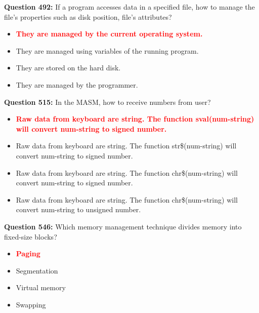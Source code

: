 \documentclass[12pt,a4paper]{article}
\begin{document}
\vspace{0.5cm}

\vspace{0.5cm}

\textbf{Question 492:} If a program accesses data in a specified file, how to manage the file's properties such as disk position, file's attributes?

\begin{itemize}
    \item[\textbf{A.}] \textcolor{red}{\textbf{They are managed by the current operating system.}}
    \item[\textbf{B.}] They are managed using variables of the running program.
    \item[\textbf{C.}] They are stored on the hard disk.
    \item[\textbf{D.}] They are managed by the programmer.
\end{itemize}

\vspace{0.5cm}

\vspace{0.5cm}

\textbf{Question 515:} In the MASM, how to receive numbers from user?

\begin{itemize}
    \item[\textbf{A.}] \textcolor{red}{\textbf{Raw data from keyboard are string. The function sval(num-string) will convert num-string to signed number.}}
    \item[\textbf{B.}] Raw data from keyboard are string. The function str\$(num-string) will convert num-string to signed number.
    \item[\textbf{C.}] Raw data from keyboard are string. The function chr\$(num-string) will convert num-string to signed number.
    \item[\textbf{D.}] Raw data from keyboard are string. The function chr\$(num-string) will convert num-string to unsigned number.
\end{itemize}

\vspace{0.5cm}

\vspace{0.5cm}



\textbf{Question 546:} Which memory management technique divides memory into fixed-size blocks?

\begin{itemize}
    \item[\textbf{A.}] \textcolor{red}{\textbf{Paging}}
    \item[\textbf{B.}] Segmentation
    \item[\textbf{C.}] Virtual memory
    \item[\textbf{D.}] Swapping
\end{itemize}
\end{document}
